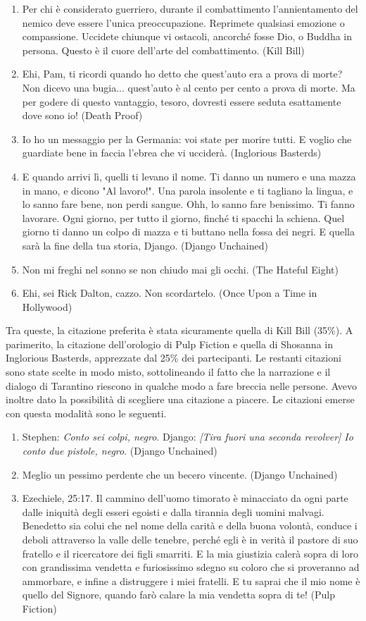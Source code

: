 \documentclass[12pt]{article} %
\begin{document}
\begin{flushleft}
\begin{enumerate}
    \item Per chi è considerato guerriero, durante il combattimento l'annientamento del nemico deve essere l'unica preoccupazione. Reprimete qualsiasi emozione o compassione. Uccidete chiunque vi ostacoli, ancorché fosse Dio, o Buddha in persona. Questo è il cuore dell'arte del combattimento. (Kill Bill)
    \item Ehi, Pam, ti ricordi quando ho detto che quest'auto era a prova di morte? Non dicevo una bugia... quest'auto è al cento per cento a prova di morte. Ma per godere di questo vantaggio, tesoro, dovresti essere seduta esattamente dove sono io! (Death Proof)
    \item Io ho un messaggio per la Germania: voi state per morire tutti. E voglio che guardiate bene in faccia l'ebrea che vi ucciderà. (Inglorious Basterds)
    \item E quando arrivi lì, quelli ti levano il nome. Ti danno un numero e una mazza in mano, e dicono "Al lavoro!". Una parola insolente e ti tagliano la lingua, e lo sanno fare bene, non perdi sangue. Ohh, lo sanno fare benissimo. Ti fanno lavorare. Ogni giorno, per tutto il giorno, finché ti spacchi la schiena. Quel giorno ti danno un colpo di mazza e ti buttano nella fossa dei negri. E quella sarà la fine della tua storia, Django. (Django Unchained)
    \item Non mi freghi nel sonno se non chiudo mai gli occhi. (The Hateful Eight)
    \item Ehi, sei Rick Dalton, cazzo. Non scordartelo. (Once Upon a Time in Hollywood)
\end{enumerate}
Tra queste, la citazione preferita è stata sicuramente quella di Kill Bill (35\%). A parimerito, la citazione dell'orologio di Pulp Fiction e quella di Shosanna in Inglorious Basterds, apprezzate dal 25\% dei partecipanti.
Le restanti citazioni sono state scelte in modo misto, sottolineando il fatto che la narrazione e il dialogo di Tarantino riescono in qualche modo a fare breccia nelle persone.
Avevo inoltre dato la possibilità di scegliere una citazione a piacere.
Le citazioni emerse con questa modalità sono le seguenti.
\begin{enumerate}
    \item Stephen: \textit{Conto sei colpi, negro}.  Django: \textit{[Tira fuori una seconda revolver] Io conto due pistole, negro}. (Django Unchained)
    \item Meglio un pessimo perdente che un becero vincente. (Django Unchained)
    \item Ezechiele, 25:17. Il cammino dell'uomo timorato è minacciato da ogni parte dalle iniquità degli esseri egoisti e dalla tirannia degli uomini malvagi. Benedetto sia colui che nel nome della carità e della buona volontà, conduce i deboli attraverso la valle delle tenebre, perché egli è in verità il pastore di suo fratello e il ricercatore dei figli smarriti. E la mia giustizia calerà sopra di loro con grandissima vendetta e furiosissimo sdegno su coloro che si proveranno ad ammorbare, e infine a distruggere i miei fratelli. E tu saprai che il mio nome è quello del Signore, quando farò calare la mia vendetta sopra di te! (Pulp Fiction) 

\end{enumerate}
\end{flushleft}
\end{document}
